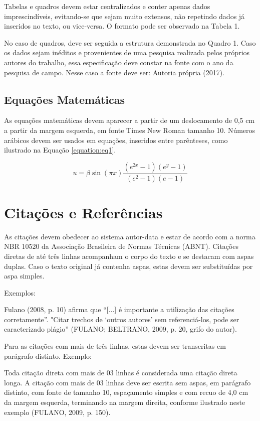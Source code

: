 \documentclass{modelo}
\begin{document}
Tabelas e quadros devem estar centralizados e conter apenas dados imprescindíveis, evitando-se que sejam muito extensos, não repetindo dados já inseridos no texto, ou vice-versa. O formato pode ser observado na Tabela 1. 

No caso de quadros, deve ser seguida a estrutura demonstrada no Quadro 1. Caso os dados sejam inéditos e provenientes de uma pesquisa realizada pelos próprios autores do trabalho, essa especificação deve constar na fonte com o ano da pesquisa de campo. Nesse caso a fonte deve ser: Autoria própria (2017). 
  
 \subsection{Equações Matemáticas} 
 As equações matemáticas devem aparecer a partir de um deslocamento de 0,5 cm a partir da margem esquerda, em fonte Times New Roman tamanho 10. Números arábicos devem ser usados em equações, inseridos entre parênteses, como ilustrado na Equação \ref{equation:eq1}.  
  
  \begin{equation}
      u = \beta \sin{\left ( \pi x \right )}\frac{\left ( e^{2x}-1 \right ) \left ( e^{y}-1 \right )}{\left ( e^{2}-1 \right ) \left ( e-1 \right )} 
      \label{equation:eq1}
  \end{equation} 
   
 
 
 \section{Citações e Referências} 
 
 As citações devem obedecer ao sistema autor-data e estar de acordo com a norma NBR 10520 da Associação Brasileira de Normas Técnicas (ABNT). 
Citações diretas de até três linhas acompanham o corpo do texto e se destacam com aspas duplas. Caso o texto original já contenha aspas, estas devem ser substituídas por aspa simples.   

Exemplos:
 
Fulano (2008, p. 10) afirma que “[...] é importante a utilização das citações corretamente”.
"Citar trechos de ‘outros autores’ sem referenciá-los, pode ser caracterizado plágio” (FULANO; BELTRANO, 2009, p. 20, grifo do autor). 

Para as citações com mais de três linhas, estas devem ser transcritas em parágrafo distinto. Exemplo:    
\begin{citacao}
Toda citação direta com mais de 03 linhas é considerada uma citação direta longa. A citação com mais de 03 linhas deve ser escrita sem aspas, em parágrafo distinto, com fonte de tamanho 10, espaçamento simples e com recuo de 4,0 cm da margem esquerda, terminando na margem direita, conforme ilustrado neste exemplo (FULANO, 2009, p. 150).  
\end{citacao} 
\end{document}
